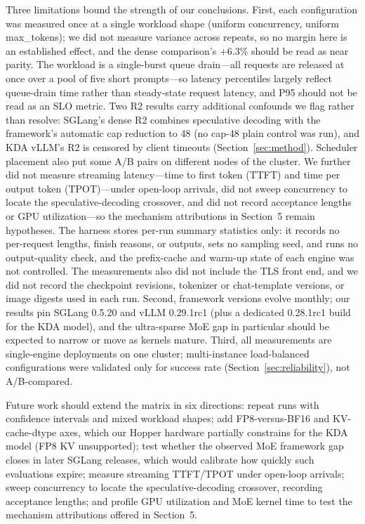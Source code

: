 \documentclass[11pt]{article}
\begin{document}
Three limitations bound the strength of our conclusions. First, each configuration was measured once at a single workload shape (uniform concurrency, uniform max\_tokens); we did not measure variance across repeats, so no margin here is an established effect, and the dense comparison's $+$6.3\% should be read as near parity. The workload is a single-burst queue drain---all requests are released at once over a pool of five short prompts---so latency percentiles largely reflect queue-drain time rather than steady-state request latency, and P95 should not be read as an SLO metric. Two R2 results carry additional confounds we flag rather than resolve: SGLang's dense R2 combines speculative decoding with the framework's automatic cap reduction to 48 (no cap-48 plain control was run), and KDA vLLM's R2 is censored by client timeouts (Section~\ref{sec:method}). Scheduler placement also put some A/B pairs on different nodes of the cluster. We further did not measure streaming latency---time to first token (TTFT) and time per output token (TPOT)---under open-loop arrivals, did not sweep concurrency to locate the speculative-decoding crossover, and did not record acceptance lengths or GPU utilization---so the mechanism attributions in Section~5 remain hypotheses. The harness stores per-run summary statistics only: it records no per-request lengths, finish reasons, or outputs, sets no sampling seed, and runs no output-quality check, and the prefix-cache and warm-up state of each engine was not controlled. The measurements also did not include the TLS front end, and we did not record the checkpoint revisions, tokenizer or chat-template versions, or image digests used in each run. Second, framework versions evolve monthly; our results pin SGLang 0.5.20 and vLLM 0.29.1rc1 (plus a dedicated 0.28.1rc1 build for the KDA model), and the ultra-sparse MoE gap in particular should be expected to narrow or move as kernels mature. Third, all measurements are single-engine deployments on one cluster; multi-instance load-balanced configurations were validated only for success rate (Section~\ref{sec:reliability}), not A/B-compared.

Future work should extend the matrix in six directions: repeat runs with confidence intervals and mixed workload shapes; add FP8-versus-BF16 and KV-cache-dtype axes, which our Hopper hardware partially constrains for the KDA model (FP8 KV unsupported); test whether the observed MoE framework gap closes in later SGLang releases, which would calibrate how quickly such evaluations expire; measure streaming TTFT/TPOT under open-loop arrivals; sweep concurrency to locate the speculative-decoding crossover, recording acceptance lengths; and profile GPU utilization and MoE kernel time to test the mechanism attributions offered in Section~5.
\end{document}
